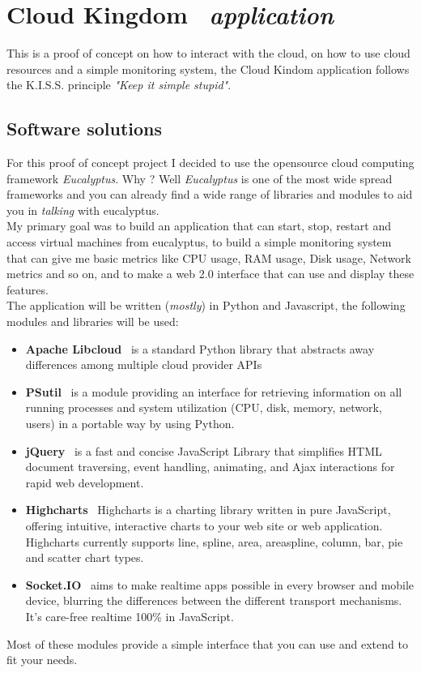 \chapter{Cloud Kingdom \textendash\ \emph{application}}
This is a proof of concept on how to interact with the cloud, on how to use cloud resources and a simple monitoring system, 
the Cloud Kindom application follows the K.I.S.S. principle \emph{"Keep it simple stupid"}.
\section{Software solutions}
For this proof of concept project I decided to use the opensource cloud computing framework \emph{Eucalyptus}. Why ? Well 
\emph{Eucalyptus} is one of the most wide spread frameworks and you can already find a wide range of libraries and modules 
to aid you in \emph{talking} with eucalyptus.\\
My primary goal was to build an application that can start, stop, restart and access virtual machines from eucalyptus, to
build a simple monitoring system that can give me basic metrics like CPU usage, RAM usage, Disk usage, Network metrics and 
so on, and to make a web 2.0 interface that can use and display these features.\\
The application will be written (\emph{mostly}) in Python and Javascript, the following modules and libraries will be used:
\begin{itemize}
  \item {\bf Apache Libcloud} \textendash\ is a standard Python library that abstracts away differences among multiple 
  cloud provider APIs
  \item {\bf PSutil} \textendash\ is a module providing an interface for retrieving information on all running processes 
  and system utilization (CPU, disk, memory, network, users) in a portable way by using Python.
  \item {\bf jQuery} \textendash\ is a fast and concise JavaScript Library that simplifies HTML document traversing, 
  event handling, animating, and Ajax interactions for rapid web development.
  \item {\bf Highcharts} \textendash\ Highcharts is a charting library written in pure JavaScript, offering intuitive, 
  interactive charts to your web site or web application. Highcharts currently supports line, spline, area, areaspline, 
  column, bar, pie and scatter chart types.
  \item {\bf Socket.IO} \textendash\ aims to make realtime apps possible in every browser and mobile device, blurring 
  the differences between the different transport mechanisms. It's care-free realtime 100\% in JavaScript.
\end{itemize}
Most of these modules provide a simple interface that you can use and extend to fit your needs.
